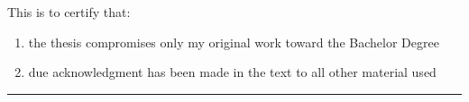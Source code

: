 \thispagestyle{empty}
This is to certify that:
\renewcommand{\labelenumi}{\roman{enumi}.}
\begin{enumerate}
\item the thesis compromises only my original work toward the Bachelor Degree
\item due acknowledgment has been made in the text to all other material used
\end{enumerate}
\renewcommand{\labelenumi}{\arabic{enumi}.}

\vspace{2cm}
\begin{flushright}
\rule[0mm]{6cm}{0.2mm}\\
\authorOfThesis\\
\submissionDate\\
\end{flushright}
